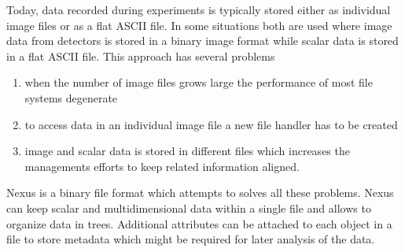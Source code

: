 
Today, data recorded during experiments is typically stored either as individual
image files or as a flat ASCII file. In some situations both are used where
image data from detectors is stored in a binary image format while scalar data
is stored in a flat ASCII file. 
This approach has several problems 
\begin{enumerate}
\item when the number of image files grows large the performance of most file
systems degenerate 
\item to access data in an individual image file a new file handler has to be
created 
\item image and scalar data is stored in different files which increases the
managements efforts to keep related information aligned.
\end{enumerate}

Nexus is a binary file format which attempts to solves all these problems. Nexus
can keep scalar and multidimensional data within a single file and allows to
organize data in trees. Additional attributes can be attached to each object in
a file to store metadata which might be required for later analysis of the data.
